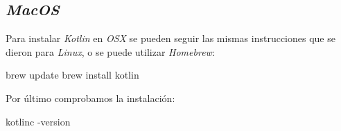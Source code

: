 \subsection{\textit{MacOS}}

  Para instalar \textit{Kotlin} en \textit{OSX} se pueden seguir las mismas instrucciones que se
  dieron para \textit{Linux}, o se puede utilizar \textit{Homebrew}:

  \begin{bash}
    brew update
    brew install kotlin
  \end{bash}

  Por último comprobamos la instalación:

  \begin{bash}
    kotlinc -version
  \end{bash}